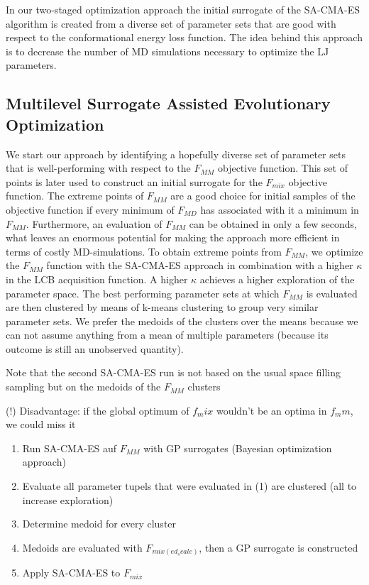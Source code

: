 \documentclass[preprint,12pt]{elsarticle}
\begin{document}
In our two-staged optimization approach the initial surrogate of the SA-CMA-ES algorithm is created from a diverse set of parameter sets that are good with respect to the conformational energy loss function. The idea behind this approach is to decrease the number of MD simulations necessary to optimize the LJ parameters.


\subsection{Multilevel Surrogate Assisted Evolutionary Optimization}

We start our approach by identifying a hopefully diverse set of parameter sets that is well-performing with respect to the $F_{MM}$ objective function. This set of points is later used to construct an initial surrogate for the $F_{mix}$ objective function. The extreme points of $F_{MM}$ are a good choice for initial samples of the objective function if every minimum of $F_{MD}$ has associated with it a minimum in $F_{MM}$. Furthermore, an evaluation of $F_{MM}$ can be obtained in only a few seconds, what leaves an enormous potential for making the approach more efficient in terms of costly MD-simulations. To obtain extreme points from $F_{MM}$, we optimize the $F_{MM}$ function with the SA-CMA-ES approach in combination with a higher $\kappa$ in the LCB acquisition function. A higher $\kappa$ achieves a higher exploration of the parameter space. The best performing parameter sets at which $F_{MM}$ is evaluated are then clustered by means of k-means clustering to group very similar parameter sets. We prefer the medoids of the clusters over the means because we can not assume anything from a mean of multiple parameters (because its outcome is still an unobserved quantity).

Note that the second SA-CMA-ES run is not based on the usual space filling sampling but on the medoids of the $F_{MM}$ clusters

(!) Disadvantage: if the global optimum of $f_mix$ wouldn't be an optima in $f_mm$, we could miss it


\begin{enumerate}
    \item Run SA-CMA-ES auf $F_{MM}$ with GP surrogates (Bayesian optimization approach)
    \item Evaluate all parameter tupels that were evaluated in (1) are clustered (all to increase exploration)
    \item Determine medoid for every cluster
    \item Medoids are evaluated with $F_{mix(ed_scale)}$, then a GP surrogate is constructed
    \item Apply SA-CMA-ES to $F_{mix}$
\end{enumerate}
\end{document}
